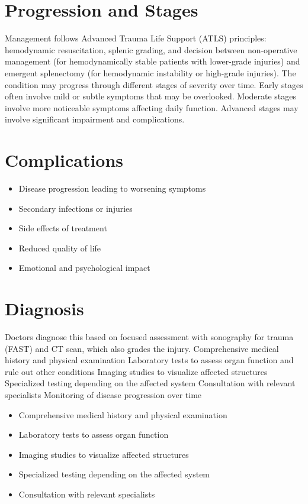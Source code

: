 \section{Progression and Stages}
Management follows Advanced Trauma Life Support (ATLS) principles: hemodynamic resuscitation, splenic grading, and decision between non-operative management (for hemodynamically stable patients with lower-grade injuries) and emergent splenectomy (for hemodynamic instability or high-grade injuries). The condition may progress through different stages of severity over time. Early stages often involve mild or subtle symptoms that may be overlooked. Moderate stages involve more noticeable symptoms affecting daily function. Advanced stages may involve significant impairment and complications.
\section{Complications}
\begin{itemize}[noitemsep]
  \item Disease progression leading to worsening symptoms
  \item Secondary infections or injuries
  \item Side effects of treatment
  \item Reduced quality of life
  \item Emotional and psychological impact
\end{itemize}
\section{Diagnosis}
Doctors diagnose this based on focused assessment with sonography for trauma (FAST) and CT scan, which also grades the injury. Comprehensive medical history and physical examination Laboratory tests to assess organ function and rule out other conditions Imaging studies to visualize affected structures Specialized testing depending on the affected system Consultation with relevant specialists Monitoring of disease progression over time

\begin{itemize}[noitemsep]
  \item Comprehensive medical history and physical examination
  \item Laboratory tests to assess organ function
  \item Imaging studies to visualize affected structures
  \item Specialized testing depending on the affected system
  \item Consultation with relevant specialists
\end{itemize}
